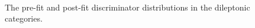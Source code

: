 \begin{figure}
\begin{centering}
\\
\caption[The pre-fit and post-fit distributions in the dileptonic categories]{The pre-fit and post-fit discriminator distributions in the dileptonic categories.}
\label{fig:tth_postfit3}
\end{centering}
\end{figure}

